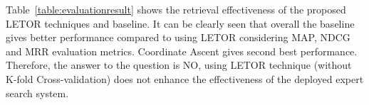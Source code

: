 \begin{table}
\centering
{}
\caption{Evaluation Results} \label{table:evaluationresult}
\end{table}

Table~\ref{table:evaluationresult} shows the retrieval effectiveness of the proposed LETOR techniques and baseline. It can be clearly seen
that overall the baseline gives better performance compared to using LETOR considering MAP, NDCG and MRR evaluation metrics. Coordinate Ascent gives second best 
performance. Therefore, the answer to the question is NO, using LETOR technique (without K-fold Cross-validation) does not enhance the 
effectiveness of the deployed expert search system.

